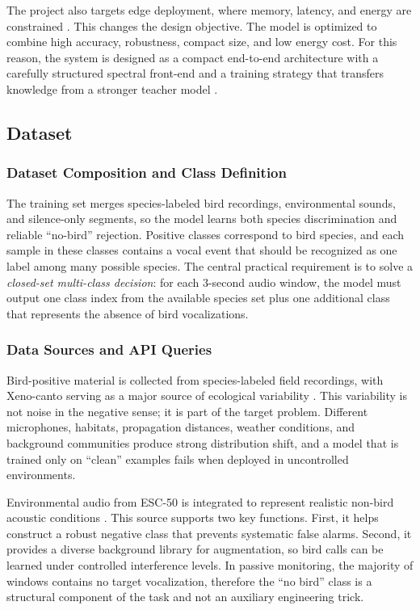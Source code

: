 \documentclass[a4paper,singleside,12pt]{report} %
\begin{document}
	The project also targets edge deployment, where memory, latency, and energy are constrained \cite{audiomoth2019}. This changes the design objective. The model is optimized to combine high accuracy, robustness, compact size, and low energy cost. For this reason, the system is designed as a compact end-to-end architecture with a carefully structured spectral front-end and a training strategy that transfers knowledge from a stronger teacher model \cite{birdnet2021,hinton2015distilling}.

	\subsection{Dataset}
	\subsubsection{Dataset Composition and Class Definition}
	The training set merges species-labeled bird recordings, environmental sounds, and silence-only segments, so the model learns both species discrimination and reliable ``no-bird'' rejection. Positive classes correspond to bird species, and each sample in these classes contains a vocal event that should be recognized as one label among many possible species. The central practical requirement is to solve a \emph{closed-set multi-class decision}: for each 3-second audio window, the model must output one class index from the available species set plus one additional class that represents the absence of bird vocalizations.

	\subsubsection{Data Sources and API Queries}
	Bird-positive material is collected from species-labeled field recordings, with Xeno-canto serving as a major source of ecological variability \cite{xenocanto}. This variability is not noise in the negative sense; it is part of the target problem. Different microphones, habitats, propagation distances, weather conditions, and background communities produce strong distribution shift, and a model that is trained only on ``clean'' examples fails when deployed in uncontrolled environments.

	Environmental audio from ESC-50 is integrated to represent realistic non-bird acoustic conditions \cite{esc50}. This source supports two key functions. First, it helps construct a robust negative class that prevents systematic false alarms. Second, it provides a diverse background library for augmentation, so bird calls can be learned under controlled interference levels. In passive monitoring, the majority of windows contains no target vocalization, therefore the ``no bird'' class is a structural component of the task and not an auxiliary engineering trick.
\end{document}
